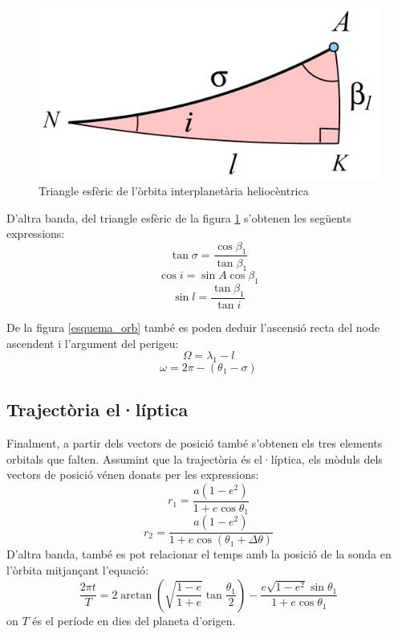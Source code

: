 \begin{figure}[H]
	\centering
	\includegraphics[scale=0.3]{./plots/triangle}
	\caption{Triangle esfèric de l'òrbita interplanetària heliocèntrica}
	\label{triang}
\end{figure}

D'altra banda, del triangle esfèric de la figura \ref{triang} s'obtenen les següents expressions:
\begin{equation}
\tan\sigma=\frac{\cos\beta_{1}}{\tan\beta_{1}}
\end{equation}
\begin{equation}
\cos i=\sin A\cos\beta_{1}
\label{eqi}
\end{equation}
\begin{equation}
\sin l=\frac{\tan\beta_{1}}{\tan i}
\end{equation}

De la figura \ref{esquema_orb} també es poden deduir l'ascensió recta del node ascendent i l'argument del perigeu:
\begin{equation}
\Omega=\lambda_{1}-l
\label{eqOmega}
\end{equation}
\begin{equation}
\omega=2\pi-\left(\theta_{1}-\sigma\right)
\label{eqw}
\end{equation}

\subsection{Trajectòria el·líptica}
Finalment, a partir dels vectors de posició també s'obtenen els tres elements orbitals que falten. Assumint que la trajectòria és el·líptica, els mòduls dels vectors de posició vénen donats per les expressions:
\begin{equation}
r_{1}=\frac{a\left(1-e^{2}\right)}{1+e\cos\theta_{1}}
\end{equation}
\begin{equation}
r_{2}=\frac{a\left(1-e^{2}\right)}{1+e\cos\left(\theta_{1}+\Delta\theta\right)}
\end{equation}
D'altra banda, també es pot relacionar el temps amb la posició de la sonda en l'òrbita mitjançant l'equació:
\begin{equation}
\frac{2\pi t}{T}=2\arctan\left(\sqrt{\frac{1-e}{1+e}}\tan\frac{\theta_{1}}{2}\right)-\frac{e\sqrt{1-e^{2}}\sin\theta_{1}}{1+e\cos\theta_{1}}
\end{equation}
on $T$ és el període en dies del planeta d'origen.

